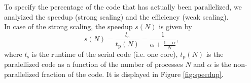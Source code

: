 \documentclass[12pt, a4paper, titlepage]{article}
\newcommand{\der}{\text{d}}
\begin{document}
{%



%
%
%
%

To specify the percentage of the code that has actually been parallelized, we analyized the speedup (strong scaling) and the efficiency (weak scaling).\\
In case of the strong scaling, the speedup $s(N)$ is given by
\begin{equation}
	s(N) = \frac{t_\text{s}}{t_\text{p}(N)}=\frac{1}{\alpha + \frac{1-\alpha}{N}},
\end{equation}
where $t_\text{s}$ is the runtime of the serial code (i.e. one core), $t_\text{p}(N)$ is the paralellized code as a function of the number of processes $N$ and $\alpha$ is the non-parallelized fraction of the code. It is displayed in Figure \ref{fig:speedup}.\\

}
\end{document}
